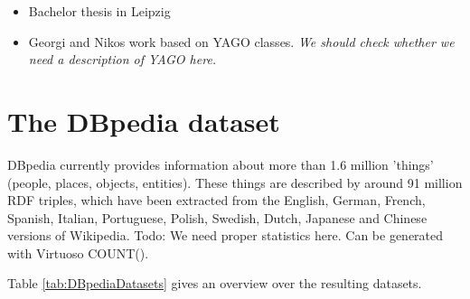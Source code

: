 \documentclass{llncs}
\begin{document}
\begin{itemize}
	\item Bachelor thesis in Leipzig
	\item Georgi and Nikos work based on YAGO classes. \emph{We should check whether we need a description of
YAGO here.}
\end{itemize}

\section{The DBpedia dataset}
\label{sec:dataset}

DBpedia currently provides information about more than 1.6 million 'things' (people, places,
objects, entities).  These things are described by around 91 million RDF triples, which have been
extracted from the English, German, French, Spanish, Italian, Portuguese, Polish, Swedish, Dutch,
Japanese and Chinese versions of Wikipedia. Todo: We need proper statistics here. Can be generated
with Virtuoso COUNT().

Table \ref{tab:DBpediaDatasets} gives an overview over the resulting datasets.
\end{document}
